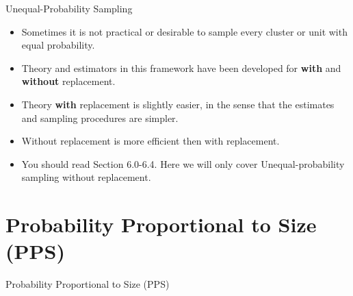 \documentclass[10pt]{beamer}\usepackage[]{graphicx}\usepackage[]{xcolor}
\begin{document}
\begin{frame}{Unequal-Probability Sampling}
\begin{itemize}
\item Sometimes it is not practical or desirable to sample every cluster or unit with equal probability.
\item Theory and estimators in this framework have been developed for \textbf{with} and \textbf{without} replacement.
\item Theory \textbf{with} replacement is slightly easier, in the sense that the estimates and sampling procedures are simpler.
\item Without replacement is more efficient then with replacement.
\item You should read Section 6.0-6.4. Here we will only cover Unequal-probability sampling without replacement.
\end{itemize}
\end{frame}

\section{Probability Proportional to Size (PPS)}

\begin{frame}{}
\begin{block}{}
\begin{center}
Probability Proportional to Size (PPS)
\end{center}
\end{block}
\end{frame}
\end{document}
